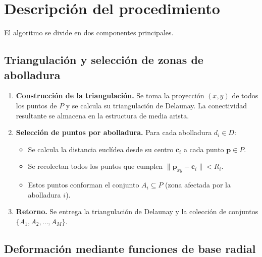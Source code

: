 \documentclass[12pt, letterpaper]{article}
\begin{document}
\section{Descripción del procedimiento}

El algoritmo se divide en dos componentes principales.

\subsection{Triangulación y selección de zonas de abolladura}

\begin{enumerate}
    \item \textbf{Construcción de la triangulación.}  
    Se toma la proyección \((x, y)\) de todos los puntos de \(P\) y se calcula su triangulación de Delaunay. La conectividad resultante se almacena en la estructura de media arista.

    \item \textbf{Selección de puntos por abolladura.}  
    Para cada abolladura \(d_i \in D\):
    \begin{itemize}
        \item Se calcula la distancia euclídea desde su centro \(\mathbf{c}_i\) a cada punto \(\mathbf{p} \in P\).
        \item Se recolectan todos los puntos que cumplen \(\|\mathbf{p}_{xy} - \mathbf{c}_i\| < R_i\).
        \item Estos puntos conforman el conjunto \(A_i \subseteq P\) (zona afectada por la abolladura \(i\)).
    \end{itemize}

    \item \textbf{Retorno.}  
    Se entrega la triangulación de Delaunay y la colección de conjuntos \\ \(\{A_1, A_2, \dots, A_M\}\).
\end{enumerate}

\subsection{Deformación mediante funciones de base radial}
\end{document}
